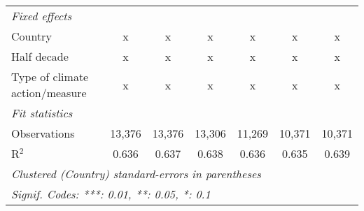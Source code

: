 \begin{tabular}{lcccccc}
   \emph{Fixed effects}\\
   Country                                                   & x       & x       & x       & x       & x            & x\\  
   Half decade                                               & x       & x       & x       & x       & x            & x\\  
   Type of climate action/measure                            & x       & x       & x       & x       & x            & x\\  
   \midrule \emph{Fit statistics}\\
   Observations                                              & 13,376  & 13,376  & 13,306  & 11,269  & 10,371       & 10,371\\  
   R$^2$                                                     & 0.636   & 0.637   & 0.638   & 0.636   & 0.635        & 0.639\\  
   \midrule
   \multicolumn{7}{l}{\emph{Clustered (Country) standard-errors in parentheses}}\\
   \multicolumn{7}{l}{\emph{Signif. Codes: ***: 0.01, **: 0.05, *: 0.1}}\\
\end{tabular}
\par\endgroup


